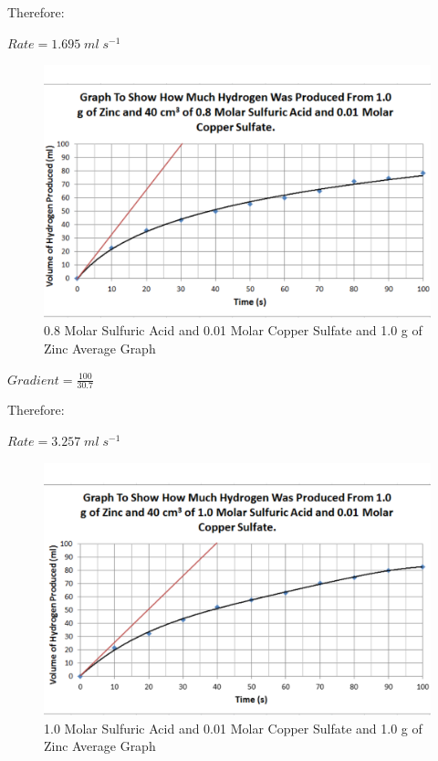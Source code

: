 Therefore:

$Rate = 1.695 \; ml \; s^{-1}$

\begin{figure}[H]
    \includegraphics[width=\textwidth]{./Analysis/Images/2Catalysed/08Molar.pdf}
    \caption{0.8 Molar Sulfuric Acid and 0.01 Molar Copper Sulfate and 1.0 g of Zinc Average Graph} \label{fig:08MolarSACSGradient}
\end{figure}

$Gradient = \frac{100}{30.7}$

Therefore:

$Rate = 3.257 \; ml \; s^{-1}$

\begin{figure}[H]
    \includegraphics[width=\textwidth]{./Analysis/Images/2Catalysed/10Molar.pdf}
    \caption{1.0 Molar Sulfuric Acid and 0.01 Molar Copper Sulfate and 1.0 g of Zinc Average Graph} \label{fig:10MolarSACSGradient}
\end{figure}

